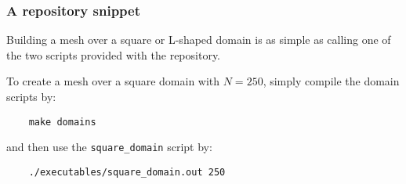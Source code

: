 \begin{frame}[fragile]
    \frametitle{A repository snippet}

    Building a mesh over a square or L-shaped domain is as simple as calling one of the two scripts provided with the repository.

    To create a mesh over a square domain with $N = 250$, simply compile the domain scripts by:

    \begin{lstlisting}
    make domains
    \end{lstlisting}

    and then use the \lstinline{square_domain} script by:

    \begin{lstlisting}
    ./executables/square_domain.out 250
    \end{lstlisting}

\end{frame}